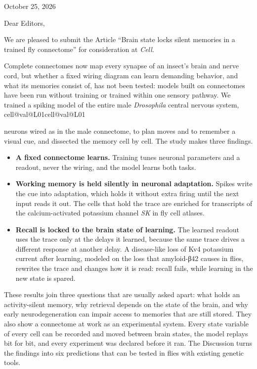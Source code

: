 \documentclass[11pt, letterpaper]{article}
\makeatletter
\newcommand{\val}[1]{\ifcsname cell@val@#1\endcsname\csname cell@val@#1\endcsname
  \else\PackageError{cover letter}{No ledger value #1}{Rebuild the ledger and values.tex}\fi}
\newcommand{\gene}[1]{\textit{#1}}
\makeatother
\begin{document}
October 25, 2026

Dear Editors,

We are pleased to submit the Article ``Brain state locks silent memories in a trained fly connectome'' for consideration at
\textit{Cell}.

Complete connectomes now map every synapse of an insect's brain and nerve cord, but whether a fixed wiring diagram can learn
demanding behavior, and what its memories consist of, has not been tested: models built on connectomes have been run without
training or trained within one sensory pathway. We trained a spiking model of the entire male \textit{Drosophila} central
nervous system, \val{L01} neurons wired as in the male connectome, to plan moves and to remember a visual cue, and dissected the
memory cell by cell. The study makes three findings.
\begin{itemize}
  \item \textbf{A fixed connectome learns.} Training tunes neuronal parameters and a readout, never the wiring, and the model
  learns both tasks.
  \item \textbf{Working memory is held silently in neuronal adaptation.} Spikes write the cue into adaptation, which holds it
  without extra firing until the next input reads it out. The cells that hold the trace are enriched for transcripts of the
  calcium-activated potassium channel \gene{SK} in fly cell atlases.
  \item \textbf{Recall is locked to the brain state of learning.} The learned readout uses the trace only at the delays it
  learned, because the same trace drives a different response at another delay. A disease-like loss of Kv4 potassium current
  after learning, modeled on the loss that amyloid-β42 causes in flies, rewrites the trace and changes how it is read:
  recall fails, while learning in the new state is spared.
\end{itemize}

These results join three questions that are usually asked apart: what holds an activity-silent memory, why retrieval depends
on the state of the brain, and why early neurodegeneration can impair access to memories that are still stored. They also show
a connectome at work as an experimental system. Every state variable of every cell can be recorded and moved between brain
states, the model replays bit for bit, and every experiment was declared before it ran. The Discussion turns the findings into
six predictions that can be tested in flies with existing genetic tools.
\end{document}
